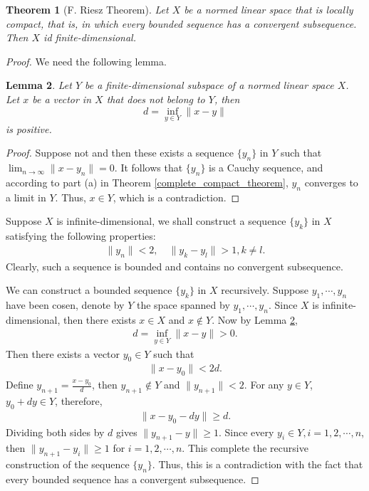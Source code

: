 \documentclass[11pt]{book}
\newtheorem{theorem}{Theorem}[section]
\newtheorem{lemma}[theorem]{Lemma}
\theoremstyle{definition}
\numberwithin{equation}{chapter}
\begin{document}
\begin{theorem}[F. Riesz Theorem]\label{riesz_theorem_finite_dim}
Let $X$ be a normed linear space that is locally compact, that is, in which every bounded sequence has a convergent subsequence. Then $X$ id finite-dimensional.
\end{theorem}
\begin{proof}
We need the following lemma.

\begin{lemma}\label{finite_dimensional_distance_lemma}
Let $Y$ be a finite-dimensional subspace of a normed linear space $X$. Let $x$ be a vector in $X$ that does not belong to $Y$, then 
$$d = \inf_{y\in Y} \|x - y\| $$
is positive. 
\end{lemma}
\begin{proof}
Suppose not and then these exists a sequence $\{y_n\}$ in $Y$ such that $\lim_{n\to\infty} \|x - y_n\| = 0$. It follows that $\{y_n\}$ is a Cauchy sequence, and according to part (a) in Theorem \ref{complete_compact_theorem}, $y_n$ converges to a limit in $Y$. Thus, $x \in Y$, which is a contradiction.
\end{proof}

Suppose $X$ is infinite-dimensional, we shall construct a sequence $\{y_k\}$ in $X$ satisfying the following properties:
\begin{align*}
    \|y_n\| < 2, \quad \|y_k - y_l\| > 1, k \neq l.
\end{align*}
Clearly, such a sequence is bounded and contains no convergent subsequence.

We can construct a bounded sequence $\{y_k\}$ in $X$ recursively. Suppose $y_1, \cdots, y_n$ have been cosen, denote by $Y$ the space spanned by $y_1, \cdots, y_n$. Since $X$ is infinite-dimensional, then there exists $x \in X$ and $x \notin Y$. Now by Lemma \ref{finite_dimensional_distance_lemma}, 
\begin{align*}
    d = \inf_{y \in Y} \|x - y\| > 0.
\end{align*}
Then there exists a vector $y_0 \in Y$ such that
\begin{align*}
    \|x - y_0\| < 2d.
\end{align*}
Define $y_{n+1} = \frac{x - y_0}{d}$, then $y_{n+1} \notin Y$ and $\|y_{n+1}\| < 2$. For any $y \in Y$, $y_0 + dy \in Y$, therefore, 
\begin{align*}
    \|x - y_0 - dy\| \geq d.
\end{align*}
Dividing both sides by $d$ gives $\|y_{n+1} - y\| \geq 1$. Since every $y_i \in Y, i = 1, 2, \cdots, n$, then $\|y_{n+1} - y_i\| \geq 1$ for $i = 1, 2, \cdots, n$. This complete the recursive construction of the sequence $\{y_n\}$. Thus, this is a contradiction with the fact that every bounded sequence has a convergent subsequence.
\end{proof}
\end{document}
